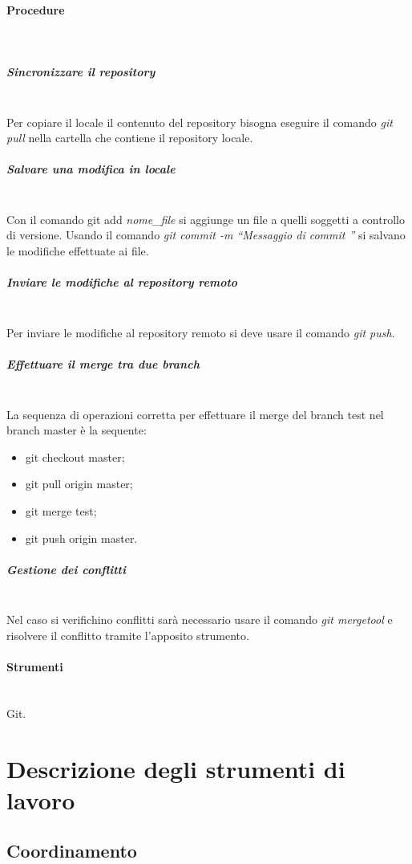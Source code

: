 \paragraph{Procedure} \hfill \\
\subparagraph{Sincronizzare il repository} \hfill \\
Per copiare il locale il contenuto del repository bisogna eseguire il comando \textit{git pull} nella cartella che contiene il repository locale.
\subparagraph{Salvare una modifica in locale} \hfill \\
Con il comando git add \textit{nome\_file} si aggiunge un file a quelli soggetti a controllo di versione. Usando il comando \textit{git commit -m “Messaggio di commit ”} si salvano le modifiche effettuate ai file.
\subparagraph{Inviare le modifiche al repository remoto} \hfill \\
Per inviare le modifiche al repository remoto si deve usare il comando \textit{git push}.

\subparagraph{Effettuare il merge tra due branch} \hfill \\
\label{merge}
La sequenza di operazioni corretta per effettuare il merge del branch test nel branch master è la sequente:
\begin{itemize}
\item git checkout master;
\item git pull origin master;
\item git merge test;
\item git push origin master.
\end{itemize}

\subparagraph{Gestione dei conflitti}  \hfill \\
Nel caso si verifichino conflitti sarà necessario usare il comando \textit{git mergetool} e risolvere il conflitto tramite l'apposito strumento.

\paragraph{Strumenti} \hfill \\
Git.




\appendix
\newpage
\section{Descrizione degli strumenti di lavoro}


\subsection{Coordinamento}

